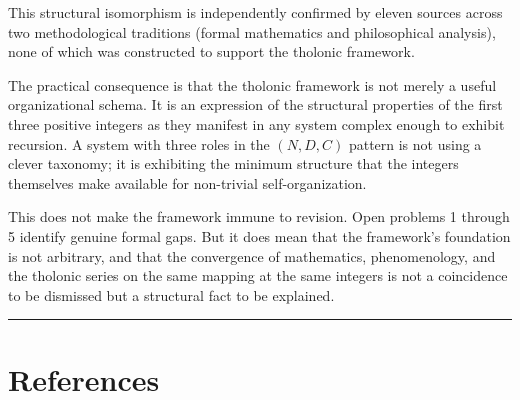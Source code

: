 \documentclass[12pt]{article}
\begin{document}
This structural isomorphism is independently confirmed by eleven sources
across two methodological traditions (formal mathematics and
philosophical analysis), none of which was constructed to support the
tholonic framework.

The practical consequence is that the tholonic framework is not merely a
useful organizational schema. It is an expression of the structural
properties of the first three positive integers as they manifest in any
system complex enough to exhibit recursion. A system with three roles in
the \((N, D, C)\) pattern is not using a clever taxonomy; it is
exhibiting the minimum structure that the integers themselves make
available for non-trivial self-organization.

This does not make the framework immune to revision. Open problems 1
through 5 identify genuine formal gaps. But it does mean that the
framework's foundation is not arbitrary, and that the convergence of
mathematics, phenomenology, and the tholonic series on the same mapping
at the same integers is not a coincidence to be dismissed but a
structural fact to be explained.

\begin{center}\rule{0.5\linewidth}{0.5pt}\end{center}

\section{References}\label{references}
\end{document}
